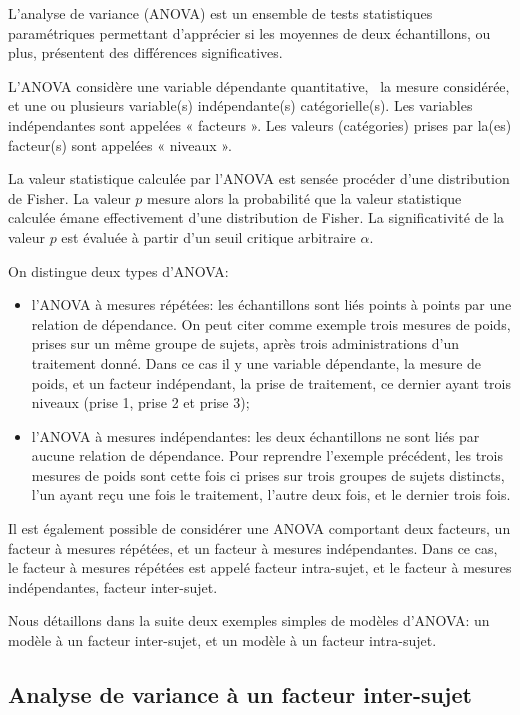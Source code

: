 L'analyse de variance (ANOVA) est un ensemble de tests statistiques paramétriques permettant d'apprécier si les moyennes de deux échantillons, ou plus, présentent des différences significatives.

L'ANOVA considère une variable dépendante quantitative, \ie~la mesure considérée, et une ou plusieurs variable(s) indépendante(s) catégorielle(s). Les variables indépendantes sont appelées « facteurs ». Les valeurs (catégories) prises par la(es) facteur(s) sont appelées « niveaux ».

La valeur statistique calculée par l'ANOVA est sensée procéder d'une distribution de Fisher. La valeur $p$ mesure alors la probabilité que la valeur statistique calculée émane effectivement d'une distribution de Fisher. La significativité de la valeur $p$ est évaluée à partir d'un seuil critique arbitraire $\alpha$.

On distingue deux types d'ANOVA:

\begin{itemize}
\item l'ANOVA à mesures répétées: les échantillons sont liés points à points par une relation de dépendance. On peut citer comme exemple trois mesures de poids, prises sur un même groupe de sujets, après trois administrations d'un traitement donné. Dans ce cas il y une variable dépendante, la mesure de poids, et un facteur indépendant, la prise de traitement, ce dernier ayant trois niveaux (prise 1, prise 2 et prise 3);  
\item l'ANOVA à mesures indépendantes: les deux échantillons ne sont liés par aucune relation de dépendance. Pour reprendre l'exemple précédent, les trois mesures de poids sont cette fois ci prises sur trois groupes de sujets distincts, l'un ayant reçu une fois le traitement, l'autre deux fois, et le dernier trois fois.
\end{itemize}

Il est également possible de considérer une ANOVA comportant deux facteurs, un facteur à mesures répétées, et un facteur à mesures indépendantes. Dans ce cas, le facteur à mesures répétées est appelé facteur intra-sujet, et le facteur à mesures indépendantes, facteur inter-sujet. 

Nous détaillons dans la suite deux exemples simples de modèles d'ANOVA: un modèle à un facteur inter-sujet, et un modèle à un facteur intra-sujet.

\subsection{Analyse de variance à un facteur inter-sujet}

